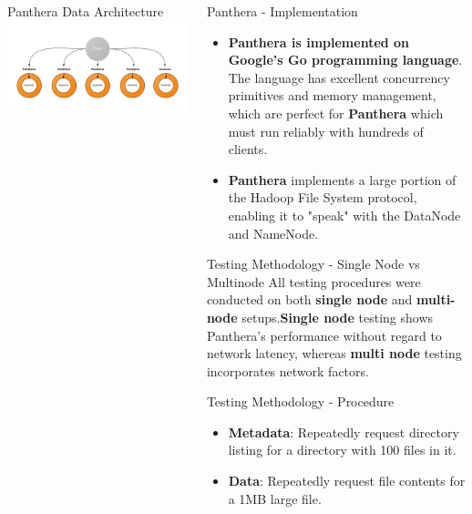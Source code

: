 \documentclass[final]{beamer} %
\begin{document}
\begin{frame}
\begin{columns}[t]
\begin{column}{0.32\textwidth}
      \begin{block}{Panthera Data Architecture}
      \includegraphics[scale=1.2]{assets/panthera_architecture.pdf}
      \end{block}

     \end{column}

    \begin{column}{0.32\textwidth}

	    
	\begin{block}{Panthera - Implementation}
	\begin{itemize}
		\item \textbf{Panthera is implemented on Google's Go programming language}. The language has excellent concurrency primitives and memory management, which are perfect for
		\textbf{Panthera} which must run reliably with hundreds of clients.
		\item \textbf{Panthera} implements a large portion of the Hadoop File System protocol, enabling it to "speak" with the DataNode and NameNode.
	\end{itemize}
	\end{block}

	\begin{block}{Testing Methodology - Single Node vs Multinode}
	All testing procedures were conducted on both \textbf{single node} and \textbf{multi-node} setups.\textbf{Single node} testing shows Panthera's performance without regard to network latency, whereas \textbf{multi node} testing incorporates network factors.
	\end{block}
	
	\begin{block}{Testing Methodology - Procedure}
	\begin{itemize}
		\item \textbf{Metadata}: Repeatedly request directory listing for a directory with 100 files in it.
		\item \textbf{Data}: Repeatedly request file contents for a 1MB large file.
	\end{itemize}
	\end{block}


\end{column}
\end{columns}
\end{frame}
\end{document}
